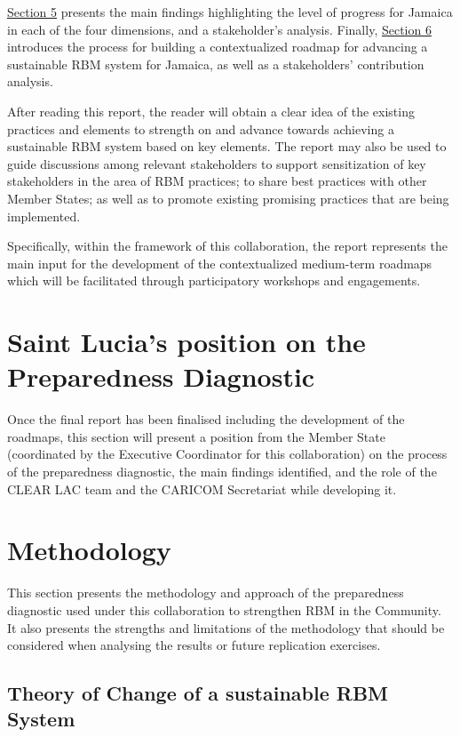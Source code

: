 \documentclass[
  10pt,
]{book}
\begin{document}
\protect\hyperlink{section5}{Section 5} presents the main findings highlighting the level of progress for Jamaica in each of the four dimensions, and a stakeholder's analysis. Finally, \protect\hyperlink{sectionux5cux26}{Section 6} introduces the process for building a contextualized roadmap for advancing a sustainable RBM system for Jamaica, as well as a stakeholders' contribution analysis.

After reading this report, the reader will obtain a clear idea of the existing practices and elements to strength on and advance towards achieving a sustainable RBM system based on key elements. The report may also be used to guide discussions among relevant stakeholders to support sensitization of key stakeholders in the area of RBM practices; to share best practices with other Member States; as well as to promote existing promising practices that are being implemented.

Specifically, within the framework of this collaboration, the report represents the main input for the development of the contextualized medium-term roadmaps which will be facilitated through participatory workshops and engagements.

\hypertarget{section2}{%
\chapter{Saint Lucia's position on the Preparedness Diagnostic}\label{section2}}

{ Once the final report has been finalised including the development of the roadmaps, this section will present a position from the Member State (coordinated by the Executive Coordinator for this collaboration) on the process of the preparedness diagnostic, the main findings identified, and the role of the CLEAR LAC team and the CARICOM Secretariat while developing it. }

\hypertarget{section3}{%
\chapter{Methodology}\label{section3}}

This section presents the methodology and approach of the preparedness diagnostic used under this collaboration to strengthen RBM in the Community. It also presents the strengths and limitations of the methodology that should be considered when analysing the results or future replication exercises.

\hypertarget{theory-of-change-of-a-sustainable-rbm-system}{%
\section{Theory of Change of a sustainable RBM System}\label{theory-of-change-of-a-sustainable-rbm-system}}
\end{document}
